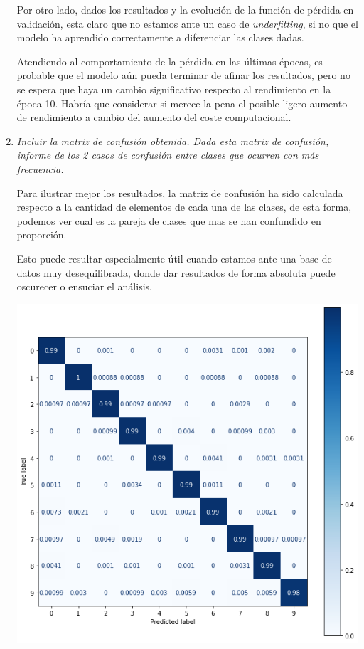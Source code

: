 \documentclass[11pt]{article}
\begin{document}
\begin{enumerate}
        Por otro lado, dados los resultados y la evolución de la función de pérdida en validación, esta claro que no estamos ante un caso de \emph{underfitting}, si no que el modelo ha aprendido correctamente a diferenciar las clases dadas.

        Atendiendo al comportamiento de la pérdida en las últimas épocas, es probable que el modelo aún pueda terminar de afinar los resultados, pero no se espera que haya un cambio significativo respecto al rendimiento en la época 10. Habría que considerar si merece la pena el posible ligero aumento de rendimiento a cambio del aumento del coste computacional.


    \item \emph{Incluir la matriz de confusión obtenida. Dada esta matriz de confusión, informe de los 2 casos de confusión entre clases que ocurren con más frecuencia.}
        
        Para ilustrar mejor los resultados, la matriz de confusión ha sido calculada respecto a la cantidad de elementos de cada una de las clases, de esta forma, podemos ver cual es la pareja de clases que mas se han confundido en proporción.

        Esto puede resultar especialmente útil cuando estamos ante una base de datos muy desequilibrada, donde dar resultados de forma absoluta puede oscurecer o ensuciar el análisis.

        \begin{center}
            \includegraphics[scale = 0.5]{imgs/mnist_confusion_matrix.png}
        \end{center}


\end{enumerate}
\end{document}
